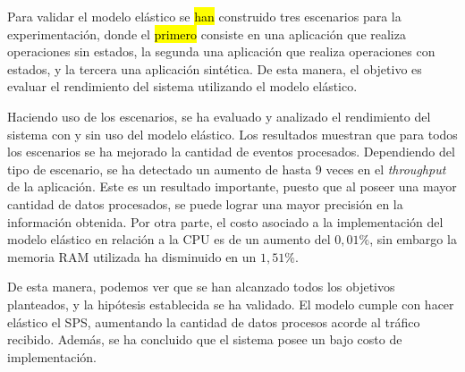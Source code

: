 Para validar el modelo elástico se \hl{han} construido tres escenarios para la experimentación, donde el \hl{primero} consiste en una aplicación que realiza operaciones sin estados, la segunda una aplicación que realiza operaciones con estados, y la tercera una aplicación sintética. De esta manera, el objetivo es evaluar el rendimiento del sistema utilizando el modelo elástico.


Haciendo uso de los escenarios, se ha evaluado y analizado el rendimiento del sistema con y sin uso del modelo elástico. Los resultados muestran que para todos los escenarios se ha mejorado la cantidad de eventos procesados. Dependiendo del tipo de escenario, se ha detectado un aumento de hasta 9 veces en el \textit{throughput} de la aplicación. Este es un resultado importante, puesto que al poseer una mayor cantidad de datos procesados, se puede lograr una mayor precisión en la información obtenida. Por otra parte, el costo asociado a la implementación del modelo elástico en relación a la CPU es de un aumento del $0,01\%$, sin embargo la memoria RAM utilizada ha disminuido en un $1,51\%$.


De esta manera, podemos ver que se han alcanzado todos los objetivos planteados, y la hipótesis establecida se ha validado. El modelo cumple con hacer elástico el SPS, aumentando la cantidad de datos procesos acorde al tráfico recibido. Además, se ha concluido que el sistema posee un bajo costo de implementación.

